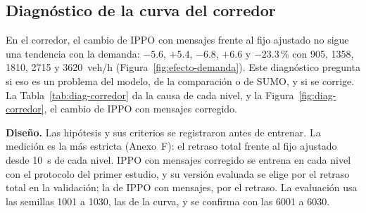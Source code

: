 \subsection*{Diagnóstico de la curva del corredor}

En el corredor, el cambio de IPPO con mensajes frente al fijo ajustado
no sigue una tendencia con la demanda: $-5.6$, $+5.4$, $-6.8$, $+6.6$ y
$-23.3$\,\% con 905, 1358, 1810, 2715 y 3620~veh/h
(Figura~\ref{fig:efecto-demanda}). Este diagnóstico pregunta si eso es
un problema del modelo, de la comparación o de SUMO, y si se corrige.
La Tabla~\ref{tab:diag-corredor} da la causa de cada nivel, y la
Figura~\ref{fig:diag-corredor}, el cambio de IPPO con mensajes
corregido.

\textbf{Diseño.} Las hipótesis y sus criterios se registraron antes de
entrenar. La medición es la más estricta (Anexo~F): el retraso total
frente al fijo ajustado desde 10~s de cada nivel. IPPO con mensajes
corregido se entrena en cada nivel con el protocolo del primer estudio,
y su versión evaluada se elige por el retraso total en la validación;
la de IPPO con mensajes, por el retraso. La evaluación usa las
semillas 1001 a 1030, las de la curva, y se confirma con las 6001 a
6030.

